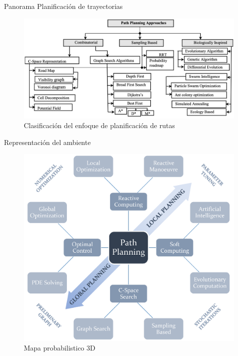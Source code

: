 \documentclass[
	12pt, %
	aspectratio=169, %
]{beamer}
\begin{document}
\begin{frame}{Panorama Planificación de trayectorias}
  \begin{figure}
    \centering
    \includegraphics[scale=0.33]{path_planning_panorama}
    \caption[Caption for LOF]{Clasificación del enfoque de planificación de rutas\footnotemark}
  \end{figure}
  
\end{frame}

\begin{frame}{Representación del ambiente}
  \begin{figure}
    \centering
    \includegraphics[scale=0.60]{panorama_planning}
    \caption[Caption for LOF]{Mapa probabilistico 3D\protect\footnotemark}
  \end{figure}
  
\end{frame}
\end{document}
